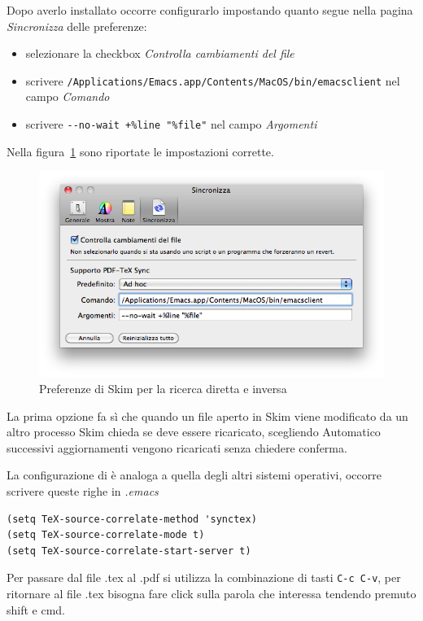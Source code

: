 \documentclass[11pt,a4paper]{article}
\begin{document}
Dopo averlo installato occorre configurarlo impostando quanto segue
nella pagina \emph{Sincronizza} delle preferenze:
\begin{itemize}
\item selezionare la checkbox \emph{Controlla cambiamenti del file}
\item scrivere
  \verb!/Applications/Emacs.app/Contents/MacOS/bin/emacsclient!  nel
  campo \emph{Comando}
\item scrivere \verb!--no-wait +%line "%file"! nel campo
  \emph{Argomenti}
\end{itemize}
Nella figura~\ref{fig:skimpref} sono riportate le impostazioni
corrette.
\begin{figure}[tb]
  \centering
  \includegraphics[width=\textwidth]{preferenze-Skim}
  \caption{Preferenze di Skim per la ricerca diretta e inversa}
  \label{fig:skimpref}
\end{figure}

La prima opzione fa sì che quando un file aperto in Skim viene
modificato da un altro processo Skim chieda se deve essere ricaricato,
scegliendo Automatico successivi aggiornamenti vengono ricaricati
senza chiedere conferma.

La configurazione di \emacs{} è analoga a quella degli altri sistemi
operativi, occorre scrivere queste righe in \emph{.emacs}
\begin{Verbatim}
(setq TeX-source-correlate-method 'synctex)
(setq TeX-source-correlate-mode t)
(setq TeX-source-correlate-start-server t)
\end{Verbatim}

Per passare dal file .tex al .pdf si utilizza la combinazione di tasti
\verb!C-c C-v!, per ritornare al file .tex bisogna fare click sulla
parola che interessa tendendo premuto shift e cmd.
\end{document}
